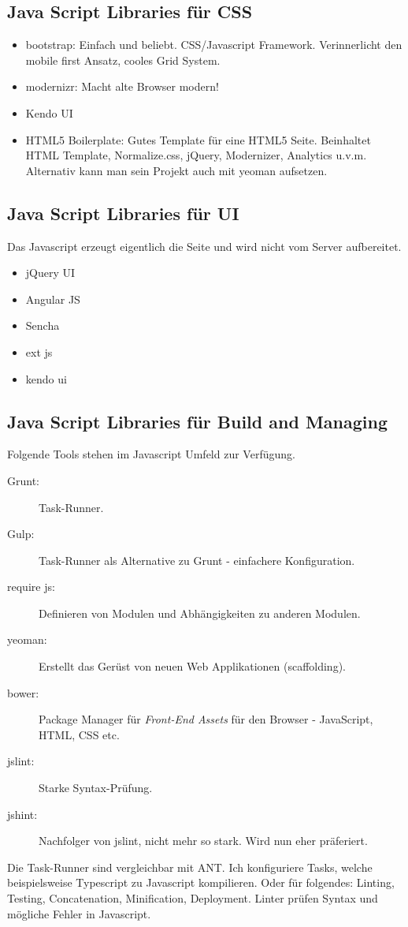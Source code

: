 \subsection{Java Script Libraries für CSS}
\begin{itemize}
	\item bootstrap: Einfach und beliebt. CSS/Javascript Framework. Verinnerlicht den mobile first Ansatz, cooles Grid System.
	\item modernizr: Macht alte Browser modern!
	\item Kendo UI
	\item HTML5 Boilerplate: Gutes Template für eine HTML5 Seite. Beinhaltet HTML Template, Normalize.css, jQuery, Modernizer, Analytics u.v.m. Alternativ kann man sein Projekt auch mit yeoman aufsetzen.
\end{itemize}

\newpage

\subsection{Java Script Libraries für UI}
Das Javascript erzeugt eigentlich die Seite und wird nicht vom Server aufbereitet.
\begin{itemize}
	\item jQuery UI
	\item Angular JS
	\item Sencha
	\item ext js
	\item kendo ui
\end{itemize}

\subsection{Java Script Libraries für Build and Managing}
Folgende Tools stehen im Javascript Umfeld zur Verfügung.
\begin{description}
	\item[Grunt:] Task-Runner.
	\item[Gulp:] Task-Runner als Alternative zu Grunt - einfachere Konfiguration.
	\item[require js:] Definieren von Modulen und Abhängigkeiten zu anderen Modulen.
	\item[yeoman:] Erstellt das Gerüst von neuen Web Applikationen (scaffolding).
	\item[bower:] Package Manager für \textit{Front-End Assets} für den Browser - JavaScript, HTML, CSS etc. 
	\item[jslint:] Starke Syntax-Prüfung.
	\item[jshint:] Nachfolger von jslint, nicht mehr so stark. Wird nun eher präferiert.
\end{description}
Die Task-Runner sind vergleichbar mit ANT. Ich konfiguriere Tasks, welche beispielsweise Typescript zu Javascript kompilieren. Oder für folgendes: Linting, Testing, Concatenation,
Minification, Deployment. Linter prüfen Syntax und mögliche Fehler in Javascript.

